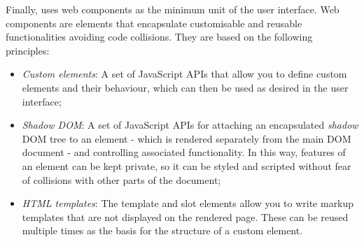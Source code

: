 Finally, \ork{} uses web components as the minimum unit of the user interface. Web components are elements that encapsulate customisable and reusable functionalities avoiding code collisions. They are based on the following principles:
\begin{itemize}
    \item \textit{Custom elements}: A set of JavaScript APIs that allow you to define custom elements and their behaviour, which can then be used as desired in the user interface;
    \item \textit{Shadow DOM}: A set of JavaScript APIs for attaching an encapsulated \textit{shadow} DOM tree to an element - which is rendered separately from the main DOM document - and controlling associated functionality. In this way, features of an element can be kept private, so it can be styled and scripted without fear of collisions with other parts of the document;
    \item \textit{HTML templates}: The template and slot elements allow you to write markup templates that are not displayed on the rendered page. These can be reused multiple times as the basis for the structure of a custom element.
\end{itemize}




